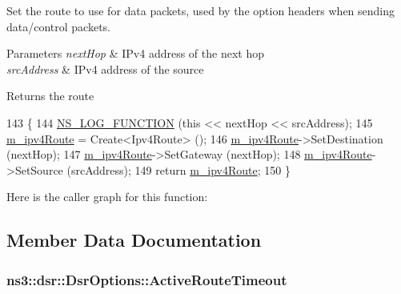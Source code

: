 Set the route to use for data packets, used by the option headers when sending data/control packets. 


\begin{DoxyParams}{Parameters}
{\em next\+Hop} & I\+Pv4 address of the next hop \\
\hline
{\em src\+Address} & I\+Pv4 address of the source \\
\hline
\end{DoxyParams}
\begin{DoxyReturn}{Returns}
the route 
\end{DoxyReturn}

\begin{DoxyCode}
143 \{
144   \hyperlink{log-macros-disabled_8h_a90b90d5bad1f39cb1b64923ea94c0761}{NS\_LOG\_FUNCTION} (\textcolor{keyword}{this} << nextHop << srcAddress);
145   \hyperlink{classns3_1_1dsr_1_1DsrOptions_ae4785209eae1d101cb8bd2d3b392d2ad}{m\_ipv4Route} = Create<Ipv4Route> ();
146   \hyperlink{classns3_1_1dsr_1_1DsrOptions_ae4785209eae1d101cb8bd2d3b392d2ad}{m\_ipv4Route}->SetDestination (nextHop);
147   \hyperlink{classns3_1_1dsr_1_1DsrOptions_ae4785209eae1d101cb8bd2d3b392d2ad}{m\_ipv4Route}->SetGateway (nextHop);
148   \hyperlink{classns3_1_1dsr_1_1DsrOptions_ae4785209eae1d101cb8bd2d3b392d2ad}{m\_ipv4Route}->SetSource (srcAddress);
149   \textcolor{keywordflow}{return} \hyperlink{classns3_1_1dsr_1_1DsrOptions_ae4785209eae1d101cb8bd2d3b392d2ad}{m\_ipv4Route};
150 \}
\end{DoxyCode}


Here is the caller graph for this function\+:




\subsection{Member Data Documentation}
\subsubsection[{\texorpdfstring{Active\+Route\+Timeout}{ActiveRouteTimeout}}]{ ns3\+::dsr\+::\+Dsr\+Options\+::\+Active\+Route\+Timeout\hspace{0.3cm}{\ttfamily [protected]}}\hypertarget{classns3_1_1dsr_1_1DsrOptions_a2d111e83b3c91f18ea49478a35ebb119}{}\label{classns3_1_1dsr_1_1DsrOptions_a2d111e83b3c91f18ea49478a35ebb119}


